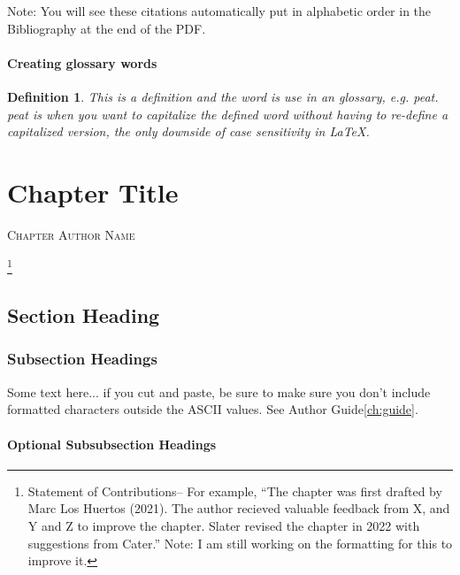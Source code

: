 \documentclass{book}\usepackage{knitr}
\makeatletter
\newtheorem{definition}[theorem]{Definition}
\newcommand{\chapterauthor}[1]{%
  {\parindent0pt\vspace*{-25pt}%
  \linespread{1.1}\large\scshape#1%
  \par\nobreak\vspace*{35pt}}
  \@afterheading%
}
\makeatother
\begin{document}
Note: You will see these citations automatically put in alphabetic order in the Bibliography at the end of the PDF. 


\subsubsection{Creating glossary words}
 

\begin{definition}
This is a definition and the word is use in an glossary, e.g. \gls{peat}. \Gls{peat} is when you want to capitalize the defined word without having to re-define a capitalized version, the only downside of case sensitivity in \LaTeX.
\end{definition}


\chapter{Chapter Title}

\chapterauthor{Chapter Author Name}

\footnote{Statement of Contributions-- For example, ``The chapter was first drafted by Marc Los Huertos (2021). The author recieved valuable feedback from X, and Y and Z to improve the chapter. Slater revised the chapter in 2022 with suggestions from Cater.'' Note: I am still working on the formatting for this to improve it.}

\section{Section Heading}%

\subsection{Subsection Headings} %

Some text here... if you cut and paste, be sure to make sure you don't include formatted characters outside the ASCII values. See Author Guide\ref{ch:guide}.

\subsubsection{Optional Subsubsection Headings} %
\end{document}
